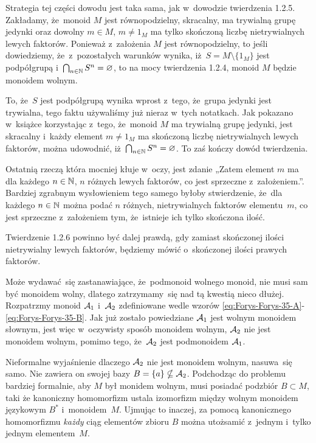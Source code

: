 \documentclass[a4paper,11pt]{article}
\begin{document}
Strategia tej części dowodu jest taka sama, jak w~dowodzie twierdzenia
1.2.5. Zakładamy, że~monoid $M$ jest równopodzielny, skracalny, ma
trywialną grupę jedynki oraz dowolny $m \in M$, $m \neq 1_{ M }$ ma
tylko skończoną liczbę nietrywialnych lewych faktorów. Ponieważ
z~założenia $M$ jest równopodzielny, to jeśli dowiedziemy,
że~z~pozostałych warunków wynika, iż~$S = M \setminus \{ 1_{ M } \}$
jest podpółgrupą i~$\bigcap_{ n \in \mathbb{N} } S^{ n } = \varnothing$, to na
mocy twierdzenia 1.2.4, monoid $M$ będzie monoidem wolnym.

To, że~$S$ jest podpółgrupą wynika wprost z~tego, że~grupa jedynki
jest trywialna, tego faktu używaliśmy już nieraz w~tych notatkach. Jak
pokazano w~książce korzystając z~tego, że~monoid $M$ ma trywialną
grupę jedynki, jest skracalny i~każdy element $m \neq 1_{ M }$ ma
skończoną liczbę nietrywialnych lewych faktorów, można udowodnić,
iż~$\bigcap_{ n \in \mathbb{N} } S^{ n } = \varnothing$. To zaś kończy dowód twierdzenia.

Ostatnią rzeczą która mocniej kłuje w~oczy, jest zdanie „Zatem element
$m$ ma dla każdego $n \in \mathbb{N}$, $n$ różnych lewych faktorów, co jest
sprzeczne z~założeniem.”. Bardziej zgrabnym wysłowieniem tego samego
byłoby stwierdzenie, że~dla każdego $n \in \mathbb{N}$ można podać $n$
różnych, nietrywialnych faktorów elementu~$m$, co jest sprzeczne
z~założeniem tym, że~istnieje ich tylko skończona ilość.

\vspace{\spaceFour}





 Twierdzenie 1.2.6 powinno być dalej prawdą, gdy zamiast skończonej
ilości nietrywialny lewych faktorów, będziemy mówić o~skończonej ilości
prawych faktorów.

\vspace{\spaceFour}





\start {} Może wydawać~się zastanawiające, że~podmonoid wolnego
monoid, nie musi sam być monoidem wolny, dlatego zatrzymamy~się nad tą
kwestią nieco dłużej. Rozpatrzmy monoid $\mathcal{A}_{ 1 }$ i~$\mathcal{A}_{ 2 }$
zdefiniowane wedle wzorów
\eqref{eq:Forys-Forys-35-A}-\eqref{eq:Forys-Forys-35-B}. Jak już
zostało powiedziane $\mathcal{A}_{ 1 }$ jest wolnym monoidem słownym, jest
więc w~oczywisty sposób monoidem wolnym, $\mathcal{A}_{ 2 }$ nie jest
monoidem wolnym, pomimo tego, że~$\mathcal{A}_{ 2 }$ jest podmonoidem
$\mathcal{A}_{ 1 }$.

Nieformalne wyjaśnienie dlaczego $\mathcal{A}_{ 2 }$ nie jest monoidem
wolnym, nasuwa~się samo. Nie zawiera on swojej bazy
$B = \{ a \} \nsubseteq \mathcal{A}_{ 2 }$. Podchodząc do problemu bardziej
formalnie, aby $M$ był monidem wolnym, musi posiadać podzbiór
$B \subset M$, taki że kanoniczny homomorfizm ustala izomorfizm między
wolnym monoidem językowym $B^{ * }$ i~monoidem~$M$. Ujmując to
inaczej, za pomocą kanonicznego homomorfizmu \textit{każdy} ciąg
elementów zbioru $B$ można utożsamić z~jednym i~tylko jednym
elementem~$M$.
\end{document}
